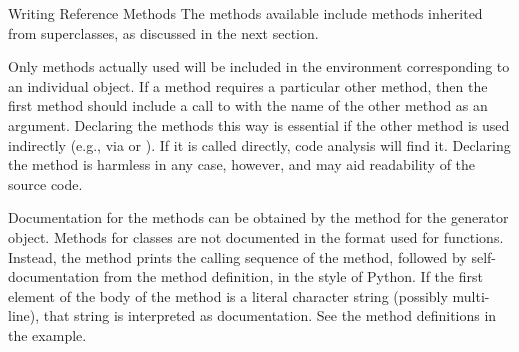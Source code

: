 \begin{Section}{Writing Reference Methods}
The methods available include methods inherited from superclasses, as
discussed in the next section.

Only methods actually used will be included in the environment
corresponding to an individual object.  If a method requires a
particular other method, then the first method should include a call
to  
with the name of the other method as an argument.
Declaring the methods this way is essential if the other method is used indirectly (e.g., via 
or ).
If it is called directly, code analysis will find it.
Declaring the method is harmless in any case, however, and may aid
readability of the source code.

Documentation for the methods can be obtained by the  
method for the generator object.
Methods for classes are not documented in the  format used
for \R{} functions.
Instead, the  
method prints the calling sequence of the method, followed by
self-documentation from the method definition, in the style of Python.
If the first element of the body of the method is a literal character
string (possibly multi-line), that string is interpreted as documentation.
See the method definitions in the example.
\end{Section}
%
